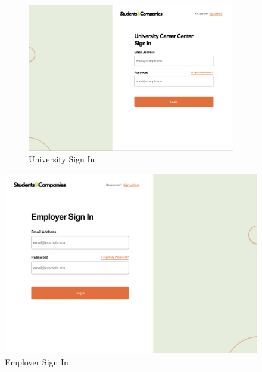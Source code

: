 \documentclass{article}
\begin{document}
\begin{figure}[H]
    \centering
\begin{figure}[H]
    \centering
    \includegraphics[scale = 0.40]{figures/UserInterfaces/General/UniCareerSignIn.png}
    \caption{University Sign In}
     \centering
\end{figure}
    \includegraphics[scale = 0.40]{figures/UserInterfaces/General/EmployerSignIn.png}
    \caption{Employer Sign In}
     \centering
\end{figure}
\end{document}

